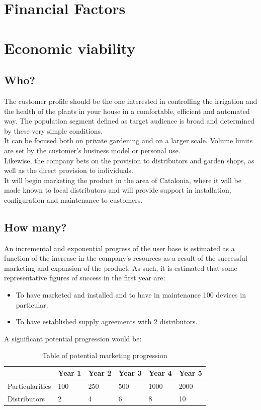 \documentclass[11pt,a4paper]{article}
\begin{document}
\section{Financial Factors}
\section{Economic viability}
\subsection{Who?}
The customer profile should be the one interested in controlling the irrigation and the health of the plants in your house in a comfortable, efficient and automated way. The population segment defined as target audience is broad and determined by these very simple conditions. \\

It can be focused both on private gardening and on a larger scale. Volume limits are set by the customer's business model or personal use. \\

Likewise, the company bets on the provision to distributors and garden shops, as well as the direct provision to individuals.\\

It will begin marketing the product in the area of Catalonia, where it will be made known to local distributors and will provide support in installation, configuration and maintenance to customers. 
\subsection{How many?}
An incremental and exponential progress of the user base is estimated as a function of the increase in the company's resources as a result of the successful marketing and expansion of the product. As such, it is estimated that some representative figures of success in the first year are: 

\begin{itemize}
\item To have marketed and installed and to have in maintenance 100 devices in particular. 
\item To have established supply agreements with 2 distributors. 
\end{itemize}
A significant potential progression would be:
\begin{table}[htbp]
\centering
\begin{tabular}{|l|l|l|l|l|l|}
\hline
\textbf{} & \textbf{Year 1} & \textbf{Year 2} & \textbf{Year 3} & \textbf{Year 4} & \textbf{Year 5} \\
\hline \hline
Particularities & 100 & 250 & 500 & 1000 & 2000 \\
\hline
Distributors & 2 & 4 & 6 & 8 & 10 \\
\hline
\end{tabular}
\caption{Table of potential marketing progression}
\end{table}
\end{document}
